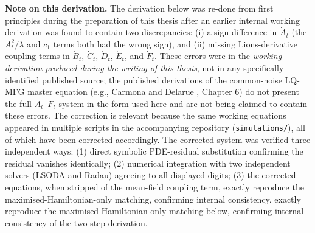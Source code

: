 \textbf{Note on this derivation.} The derivation below was re-done from
first principles during the preparation of this thesis after an earlier
internal working derivation was found to contain two discrepancies: (i) a sign difference
in $\dot{A}_t$ (the $A_t^2/\lambda$ and $c_1$ terms both had the wrong sign),
and (ii) missing Lions-derivative coupling terms in $\dot{B}_t$, $\dot{C}_t$,
$\dot{D}_t$, $\dot{E}_t$, and $\dot{F}_t$. These errors were in the \emph{working
derivation produced during the writing of this thesis}, not in any
specifically identified published source; the published derivations of the
common-noise LQ-MFG master equation (e.g., Carmona and Delarue
\citep{carmonadelarue2018}, Chapter 6) do not present the full $A_t$--$F_t$
system in the form used here and are not being claimed to contain these
errors. The correction is relevant because the same working equations
appeared in multiple scripts in the accompanying repository
(\texttt{simulations/}), all of which have been corrected accordingly.
The corrected system was verified three independent ways:
(1) direct symbolic PDE-residual substitution confirming the residual
vanishes identically; (2) numerical integration with two independent solvers
(LSODA and Radau) agreeing to all displayed digits; (3) the corrected
equations, when stripped of the mean-field coupling term, exactly reproduce
the maximised-Hamiltonian-only matching, confirming internal consistency.
exactly reproduce the maximised-Hamiltonian-only matching below, confirming
internal consistency of the two-step derivation.

